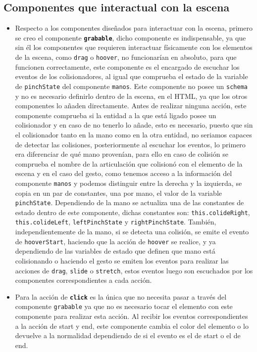 \documentclass[a4paper, 12pt]{book}
\begin{document}
\subsection{Componentes que interactual con la escena}
\label{subsec:componentes-interactivos}
\begin{itemize}
  \item Respecto a los componentes diseñados para interactuar con la escena, primero se creo el componente \textbf{\texttt{grabable}}, dicho componente es indispensable, ya que sin él los componentes que requieren interactuar físicamente con los elementos de la escena, como \texttt{drag} o \texttt{hoover}, no funcionarían en absoluto, para que funcionen correctamente, este componente es el encargado de escuchar los eventos de los colisionadores, al igual que comprueba el estado de la variable de \texttt{pinchState} del componente \texttt{manos}. Este componente no posee un \texttt{schema} y no es necesario definirlo dentro de la escena, en el HTML, ya que los otros componentes lo añaden directamente. Antes de realizar ninguna acción, este componente comprueba si la entidad a la que está ligado posee un colisionador y en caso de no tenerlo lo añade, esto es necesario, puesto que sin el colisionador tanto en la mano como en la otra entidad, no seriamos capaces de detectar las colisiones, posteriormente al escuchar los eventos, lo primero era diferenciar de qué mano provenían, para ello en caso de colisión se comprueba el nombre de la articulación que colisionó con el elemento de la escena y en el caso del gesto, como tenemos acceso a la información del componente \texttt{manos} y podemos distinguir entre la derecha y la izquierda, se copia en un par de constantes, una por mano, el valor de la variable \texttt{pinchState}. Dependiendo de la mano se actualiza una de las constantes de estado dentro de este componente, dichas constantes son: \texttt{this.colideRight}, \texttt{this.colideLeft}, \texttt{leftPinchState} y \texttt{rightPinchState}. También, independientemente de la mano, si se detecta una colisión,
se emite el evento de \texttt{hooverStart}, haciendo que la acción de \texttt{hoover} se realice, y ya dependiendo de las variables de estado que definen que mano está colisionando o haciendo el gesto se emiten los eventos para realizar las acciones de \texttt{drag}, \texttt{slide} o \texttt{stretch}, estos eventos luego son escuchados por los componentes correspondientes a cada acción.

  \item Para la acción de \textbf{\texttt{click}} es la única que no necesita pasar a través del componente \texttt{grabable} ya que no es necesario tocar el elemento con este componente para realizar esta acción. 
Al recibir los eventos correspondientes a la acción de start y end, este componente cambia el color del elemento o lo devuelve a la normalidad dependiendo de si el evento es el de start o el de end. 


\end{itemize}
\end{document}
